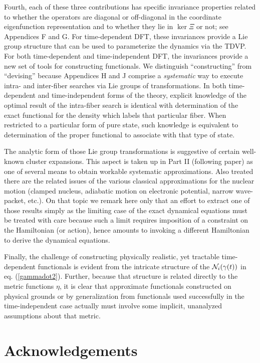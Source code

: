 Fourth, each of these three contributions has specific invariance properties
related to whether the operators are diagonal or off-diagonal in the
coordinate eigenfunction representation and to whether they lie in $\ker \Xi 
$ or not; see Appendices F and G. For time-dependent DFT, these invariances
provide a Lie group structure that can be used to parameterize the dynamics
via the TDVP. For both time-dependent and time-independent DFT, the
invariances provide a new set of tools for constructing functionals. We
distinguish ``constructing'' from ``devising'' because Appendices H and J
comprise a {\em systematic} way to execute intra- and inter-fiber searches
via Lie groups of transformations. In both time-dependent and
time-independent forms of the theory, explicit knowledge of the optimal
result of the intra-fiber search is identical with determination of the
exact functional for the density which labels that particular fiber. When
restricted to a particular form of pure state, such knowledge is equivalent
to determination of the proper functional to associate with that type of
state.

The analytic form of those Lie group transformations is suggestive of
certain well-known cluster expansions.\cite{Blaizot86} This aspect is taken
up in Part II (following paper) as one of several means to obtain workable
systematic approximations. Also treated there are the related issues of the
various classical approximations for the nuclear motion (clamped nucleus,
adiabatic motion on electronic potential, narrow wave-packet, etc.). On that
topic we remark here only that an effort to extract one of those results
simply as the limiting case of the exact dynamical equations must be treated
with care because such a limit requires imposition of a constraint on the
Hamiltonian (or action), hence amounts to invoking a different Hamiltonian
to derive the dynamical equations.

Finally, the challenge of constructing physically realistic, yet tractable
time-dependent functionals is evident from the intricate structure of the $%
{\cal N}_{i} (\gamma (t))$ in eq. (\ref{gammadot2}). Further, because that
structure is related directly to the metric functions $\eta$, it is clear
that approximate functionals constructed on physical grounds or by
generalization from functionals used successfully in the time-independent
case actually must involve some implicit, unanalyzed assumptions about that
metric.

\section{Acknowledgements}

